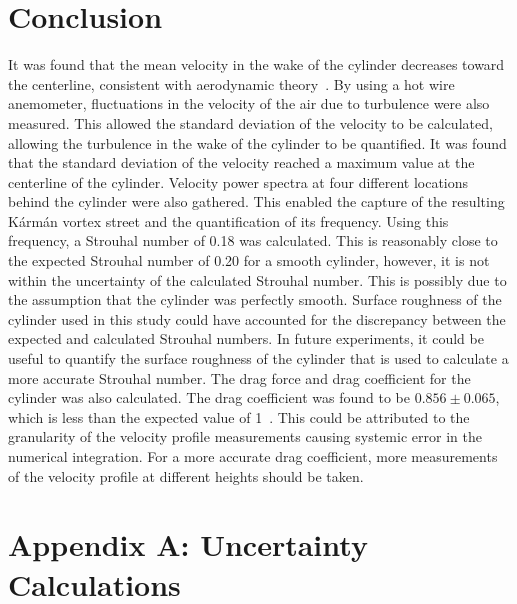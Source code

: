 \documentclass[journal,letterpaper]{IEEEtran}
\begin{document}
\section{Conclusion}


It was found that the mean velocity in the wake of the cylinder decreases toward the centerline, consistent with aerodynamic theory~\cite{labDoc}.
By using a hot wire anemometer, fluctuations in the velocity of the air due to turbulence were also measured.
This allowed the standard deviation of the velocity to be calculated, allowing the turbulence in the wake of the cylinder to be quantified.
It was found that the standard deviation of the velocity reached a maximum value at the centerline of the cylinder.
Velocity power spectra at four different locations behind the cylinder were also gathered.
This enabled the capture of the resulting Kármán vortex street and the quantification of its frequency.
Using this frequency, a Strouhal number of 0.18 was calculated.
This is reasonably close to the expected Strouhal number of 0.20 for a smooth cylinder, however, it is not within the uncertainty of the calculated Strouhal number.
This is possibly due to the assumption that the cylinder was perfectly smooth.
Surface roughness of the cylinder used in this study could have accounted for the discrepancy between the expected and calculated Strouhal numbers.
In future experiments, it could be useful to quantify the surface roughness of the cylinder that is used to calculate a more accurate Strouhal number.
The drag force and drag coefficient for the cylinder was also calculated.
The drag coefficient was found to be $0.856 \pm 0.065$, which is less than the expected value of 1~\cite{dragRef}.
This could be attributed to the granularity of the velocity profile measurements causing systemic error in the numerical integration.
For a more accurate drag coefficient, more measurements of the velocity profile at different heights should be taken.


\section*{Appendix A: Uncertainty Calculations}
\end{document}

